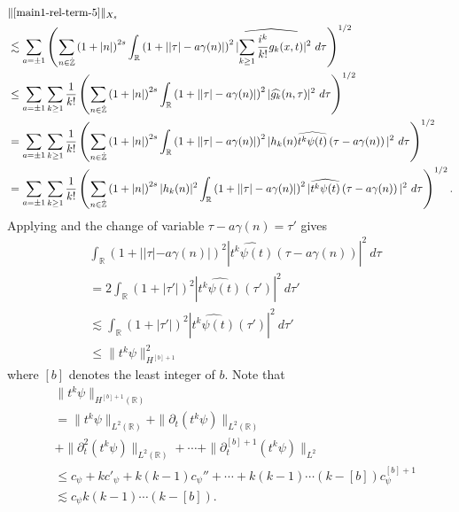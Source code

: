 \documentclass[12pt,reqno]{amsart}
\numberwithin{equation}{section}  %
\renewcommand{\cref}{\Cref}
\newcommand{\rr}{\mathbb{R}}
\newcommand{\zz}{\mathbb{Z}}
\newcommand{\zzdot}{\dot{\zz}}
\newcommand{\wh}{\widehat}
\newcommand{\p}{\partial}
\begin{document}
\begin{equation}
	\label{2n}
	\begin{split}
		& \|\cref{main1-rel-term-5}\|_{X_{s}} 
    \\
    & \lesssim \sum_{a = \pm 1} \left( \sum_{n \in \zzdot} \left (1 + |n| \right )^{2s}
    \int_\rr \left( 1 + | |\tau| - a\gamma(n) | \right)^{2}
    | \wh{\sum_{k \ge 1} \frac{i^k}{k!}g_k(x,t)} |^2 \ d \tau
		\right)^{1/2}
		\\
		& \le \sum_{a = \pm 1}\sum_{k \ge 1} \frac{1}{k!}\left( \sum_{n \in \zzdot} \left (1 + |n| \right )^{2s}
    \int_\rr \left( 1 + | |\tau| - a\gamma(n) | \right)^{2} | \wh{g_k}(n, \tau) |^2 \
		d \tau \right)^{1/2}
		\\
		& = \sum_{a = \pm 1}\sum_{k \ge 1} \frac{1}{k!} \left( \sum_{n \in \zzdot} \left (1 + |n| \right )^{2s}
    \int_\rr \left( 1 + | |\tau| - a\gamma(n) | \right)^{2} | h_k(n) \wh{t^k
		\psi(t)} \left( \tau - a\gamma(n) \right) |^2 \ d \tau \right)^{1/2}
		\\
		& = \sum_{a = \pm 1}\sum_{k \ge 1} \frac{1}{k!} \left( \sum_{n \in \zzdot} \left (1 + |n| \right )^{2s} |
    h_k(n) |^2 \int_\rr \left( 1 + | |\tau| - a\gamma(n) | \right)^{2} | \wh{t^k
		\psi(t)} \left( \tau - a\gamma(n) \right) |^2 \ d \tau \right)^{1/2}.
	\end{split}
\end{equation}
%
%
Applying \cref{eqn:norm-key-ineq} and the change
of variable $\tau - a\gamma(n) = \tau'$
gives
%
%
\begin{equation}
	\label{3n}
	\begin{split}
		& \int_\rr \left( 1 + | |\tau| - a\gamma(n) | \right)^{2} | \wh{t^{k}
		\psi(t)}\left( \tau - a\gamma(n) \right) |^2 \ d \tau
    \\
    & = 2 
    \int_\rr \left( 1 + |\tau'| \right)^{2} | \wh{t^k \psi(t)}(\tau') |^2 \
		d \tau'
		\\
    & \lesssim
    \int_\rr \left( 1 + |\tau'| \right)^{2} | \wh{t^k \psi(t)}(\tau')
		|^2 \ d \tau'
		\\
    & \le \| t^{k} \psi \|_{H^{[b] +
  1}}^{2}
\end{split}
\end{equation}
%
%
where $[b]$ denotes the least integer of $b$. Note that
%
%
\begin{equation}
	\label{4n}
	\begin{split}
    & \|t^k \psi \|_{H^{[b] +1}(\rr)}
		\\
    & = \|t^k \psi\|_{L^2(\rr)} + \|\p_t (t^k \psi )
    \|_{L^2(\rr)} 
    \\
    & + \| \p_{t}^{2} (t^{k} \psi) \|_{L^{2}(\rr)} + \cdots + \|
    \p_{t}^{[b] + 1} (t^{k} \psi)\|_{L^{2}}
    \\
    & \le c_{\psi} + k c'_{\psi} + k (k -1) c_{\psi}'' + \cdots +
    k(k-1) \cdots (k - [b]) c_{\psi}^{[b] + 1}
    \\
    & \lesssim c_{\psi} k(k-1) \cdots (k - [b]).
	\end{split}
\end{equation}
\end{document}
